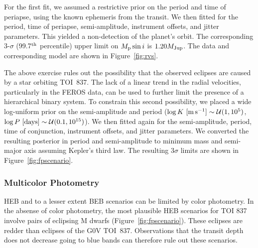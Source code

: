 \documentclass[12pt,twocolumn,tighten]{aastex63}
\newcommand{\tn}{TOI~837} %
\begin{document}
For the first fit, we assumed a restrictive prior on the period and
time of periapse, using the known ephemeris from the transit.  We then
fitted for the period, time of periapse, semi-amplitude, instrument
offsets, and jitter parameters.  This yielded a non-detection of the
planet's orbit.  The corresponding 3-$\sigma$ (99.7$^{\rm th}$
percentile) upper limit on $M_{\rm p} \sin i$ is $1.20 M_{\rm Jup}$.
The data and corresponding model are shown in Figure~\ref{fig:rvs}.

The above exercise rules out the possibility that the observed
eclipses are caused by a star orbiting \tn.  The lack of a linear
trend in the radial velocities, particularly in the FEROS data, can be
used to further limit the presence of a hierarchical binary system.
To constrain this second possibility, we placed a wide log-uniform
prior on the semi-amplitude and period ($\log K\ [{\rm m\,s^{-1}}]
\sim \mathcal{U}(1,10^5)$, $\log P\ [{\rm days}] \sim \mathcal{U}(0.1,
10^{15})$).  We then fitted again for the semi-amplitude, period, time
of conjunction, instrument offsets, and jitter parameters.  We
converted the resulting posterior in period and semi-amplitude to
minimum mass and semi-major axis assuming Kepler's third law.  The
resulting $3\sigma$ limits are shown in Figure~\ref{fig:fpscenario}.

\subsubsection{Multicolor Photometry}

HEB and to a lesser extent BEB scenarios can be limited
by color photometry.
In the absense of color photometry, the most plausible HEB scenarios for TOI
837 involve pairs of eclipsing M dwarfs (Figure~\ref{fig:fpscenario}).
These eclipses are redder than eclipses of the G0V \tn.
Observations that the transit depth does not decrease
going to blue bands can therefore rule out these scenarios.
\end{document}
